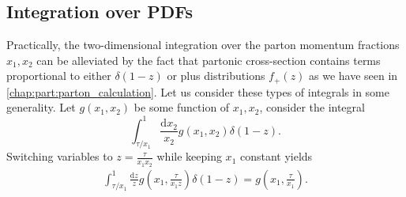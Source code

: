 \documentclass[../main.tex]{subfiles}
\begin{document}
\subsection{Integration over PDFs}
Practically, the two-dimensional integration over the parton momentum fractions \(x_1, x_2\) can be alleviated by the fact that partonic cross-section contains terms proportional to either \(\delta(1-z)\) or plus distributions \(f_+(z)\) as we have seen in \cref{chap:part:parton_calculation}.
Let us consider these types of integrals in some generality.
Let \(g(x_1, x_2)\) be some function of \(x_1, x_2\), consider the integral
\begin{equation}
  \int_{\tau/x_1}^1 \! \frac{\mathrm{d}x_2}{x_2} g(x_1, x_2) \delta(1-z).
\end{equation}
Switching variables to \(z = \frac{\tau}{x_1 x_2}\) while keeping \(x_1\) constant yields
\begin{align}
  \int_{\tau/x_1}^1 \! \frac{\mathrm{d}z}{z}  g(x_1, \frac{\tau}{x_1 z}) \delta(1-z) = g(x_1, \frac{\tau}{x_1}).
\end{align}
\end{document}
